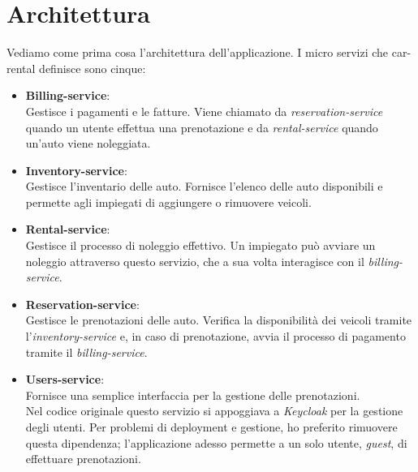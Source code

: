 \section{Architettura}
\label{sec:servizi}
Vediamo come prima cosa l'architettura dell'applicazione. I micro servizi che car-rental definisce sono cinque:
\begin{itemize}
    \item \textbf{Billing-service}: \\
        Gestisce i pagamenti e le fatture. Viene chiamato da \textit{reservation-service} quando un utente effettua una prenotazione e da \textit{rental-service} quando un'auto viene noleggiata.
    \item \textbf{Inventory-service}: \\
        Gestisce l'inventario delle auto. Fornisce l'elenco delle auto disponibili e permette agli impiegati di aggiungere o rimuovere veicoli.
    \item \textbf{Rental-service}: \\
        Gestisce il processo di noleggio effettivo. Un impiegato può avviare un noleggio attraverso questo servizio, che a sua volta interagisce con il \textit{billing-service}.
    \item \textbf{Reservation-service}: \\
        Gestisce le prenotazioni delle auto. Verifica la disponibilità dei veicoli tramite l'\textit{inventory-service} e, in caso di prenotazione, avvia il processo di pagamento tramite il \textit{billing-service}.
    \item \textbf{Users-service}: \\
        Fornisce una semplice interfaccia per la gestione delle prenotazioni. \\
        Nel codice originale questo servizio si appoggiava a \textit{Keycloak} per la gestione degli utenti. Per problemi di deployment e gestione, ho preferito rimuovere questa dipendenza; l'applicazione adesso permette a un solo utente, \textit{guest}, di effettuare prenotazioni.
\end{itemize}

